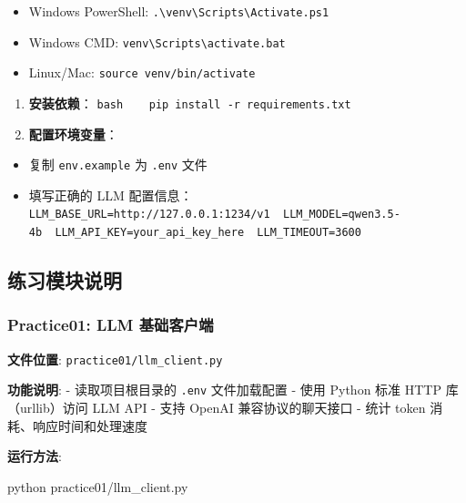 \documentclass[]{article}
\newenvironment{Shaded}{}{}
\newcommand{\ExtensionTok}[1]{#1}
\newcommand{\NormalTok}[1]{#1}
\providecommand{\tightlist}{%
  \setlength{\itemsep}{0pt}\setlength{\parskip}{0pt}}
\begin{document}
\begin{itemize}
\tightlist
\item
  Windows PowerShell:
  \texttt{.\textbackslash{}venv\textbackslash{}Scripts\textbackslash{}Activate.ps1}
\item
  Windows CMD:
  \texttt{venv\textbackslash{}Scripts\textbackslash{}activate.bat}
\item
  Linux/Mac: \texttt{source\ venv/bin/activate}
\end{itemize}

\begin{enumerate}
\def\labelenumi{\arabic{enumi}.}
\setcounter{enumi}{2}
\item
  \textbf{安装依赖}：
  \texttt{bash\ \ \ \ pip\ install\ -r\ requirements.txt}
\item
  \textbf{配置环境变量}：
\end{enumerate}

\begin{itemize}
\tightlist
\item
  复制 \texttt{env.example} 为 \texttt{.env} 文件
\item
  填写正确的 LLM 配置信息：
  \texttt{LLM\_BASE\_URL=http://127.0.0.1:1234/v1\ \ LLM\_MODEL=qwen3.5-4b\ \ LLM\_API\_KEY=your\_api\_key\_here\ \ LLM\_TIMEOUT=3600}
\end{itemize}

\subsection{练习模块说明}\label{ux7ec3ux4e60ux6a21ux5757ux8bf4ux660e}

\subsubsection{Practice01: LLM
基础客户端}\label{practice01-llm-ux57faux7840ux5ba2ux6237ux7aef}

\textbf{文件位置}: \texttt{practice01/llm\_client.py}

\textbf{功能说明}: - 读取项目根目录的 \texttt{.env} 文件加载配置 - 使用
Python 标准 HTTP 库（urllib）访问 LLM API - 支持 OpenAI
兼容协议的聊天接口 - 统计 token 消耗、响应时间和处理速度

\textbf{运行方法}:

\begin{Shaded}
\begin{Highlighting}[]
\ExtensionTok{python}\NormalTok{ practice01/llm_client.py}
\end{Highlighting}
\end{Shaded}
\end{document}
